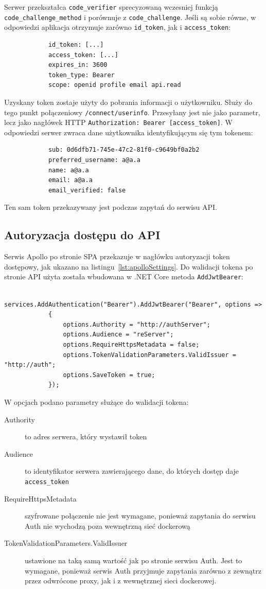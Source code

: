 		Serwer przekształca \verb|code_verifier| sprecyzowaną wczesniej funkcją \verb|code_challenge_method| i porównuje z \verb|code_challenge|.
		Jeśli są sobie równe, w odpowiedzi aplikacja otrzymuje zarówno \verb|id_token|, jak i \verb|access_token|:
		\begin{lstlisting}
			id_token: [...]
			access_token: [...]
			expires_in: 3600
			token_type: Bearer
			scope: openid profile email api.read
		\end{lstlisting}
		Uzyskany token zostaje użyty do pobrania informacji o użytkowniku.
		Służy do tego punkt połączeniowy \verb|/connect/userinfo|.
		Przesyłany jest nie jako parametr, lecz jako nagłówek HTTP \verb|Authorization: Bearer [access_token]|.
		W odpowiedzi serwer zwraca dane użytkownika identyfikującym się tym tokenem:
		\begin{lstlisting}
			sub: 0d6dfb71-745e-47c2-81f0-c9649bf0a2b2
			preferred_username: a@a.a
			name: a@a.a
			email: a@a.a
			email_verified: false
		\end{lstlisting}
		Ten sam token przekazywany jest podczas zapytań do serwisu API.

	\subsection{Autoryzacja dostępu do API}\label{sec:oidApi}
		Serwis Apollo po stronie SPA przekazuje w nagłówku autoryzacji token dostępowy, jak ukazano na listingu~\ref{lst:apolloSettings}.
		Do walidacji tokena po stronie API użyta została wbudowana w .NET Core metoda \verb|AddJwtBearer|:
		\begin{lstlisting}
			services.AddAuthentication("Bearer").AddJwtBearer("Bearer", options =>
			{
				options.Authority = "http://authServer";
				options.Audience = "reServer";
				options.RequireHttpsMetadata = false;
				options.TokenValidationParameters.ValidIssuer = "http://auth";
				options.SaveToken = true;
			});
		\end{lstlisting}
		W opcjach podano parametry służące do walidacji tokena:
		\begin{description}
			\item[Authority] to adres serwera, który wystawił token
			\item[Audience] to identyfikator serwera zawierającego dane, do których dostęp daje \verb|access_token|
			\item[RequireHttpsMetadata] szyfrowane połączenie nie jest wymagane, ponieważ zapytania do serwisu Auth nie wychodzą poza wewnętrzną sieć dockerową
			\item[TokenValidationParameters.ValidIssuer] ustawione na taką samą wartość jak po stronie serwisu Auth.
				Jest to wymagane, ponieważ serwis Auth przyjmuje zapytania zarówno z zewnątrz przez odwrócone proxy, jak i z wewnętrznej sieci dockerowej.
		\end{description}

